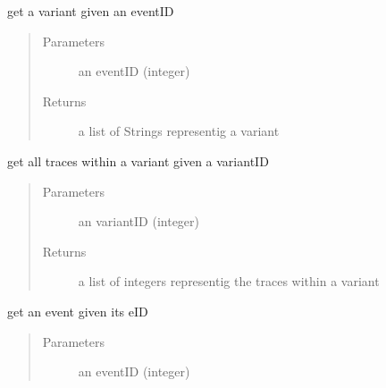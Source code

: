 \documentclass[letterpaper,10pt,english]{sphinxmanual}
\begin{document}
\begin{fulllineitems}
\begin{fulllineitems}
\label{\detokenize{preprocessing:eventLogProcessing.DBTool.DBTool.getVariantByEventID}}
get a variant given an eventID
\begin{quote}\begin{description}
\item[{Parameters}] \leavevmode
{} \textendash{} an eventID (integer)

\item[{Returns}] \leavevmode
a list of Strings representig a variant

\end{description}\end{quote}

\end{fulllineitems}


\begin{fulllineitems}
\label{\detokenize{preprocessing:eventLogProcessing.DBTool.DBTool.getTracesByVariantID}}
get all traces within a variant given a variantID
\begin{quote}\begin{description}
\item[{Parameters}] \leavevmode
{} \textendash{} an variantID (integer)

\item[{Returns}] \leavevmode
a list of integers representig the traces within a variant

\end{description}\end{quote}

\end{fulllineitems}


\begin{fulllineitems}
\label{\detokenize{preprocessing:eventLogProcessing.DBTool.DBTool.getEventByID}}
get an event given its eID
\begin{quote}\begin{description}
\item[{Parameters}] \leavevmode
{} \textendash{} an eventID (integer)


\end{description}
\end{quote}
\end{fulllineitems}
\end{fulllineitems}
\end{document}
